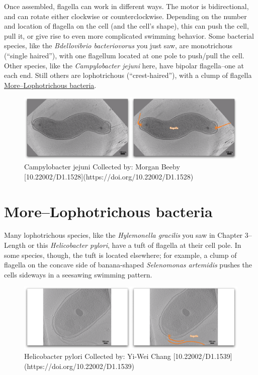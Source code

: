 \documentclass[]{tufte-book}
\begin{document}
Once assembled, flagella can work in different ways. The motor is
bidirectional, and can rotate either clockwise or counterclockwise.
Depending on the number and location of flagella on the cell (and the
cell's shape), this can push the cell, pull it, or give rise to even
more complicated swimming behavior. Some bacterial species, like the
\emph{Bdellovibrio bacteriovorus} you just saw, are monotrichous
(``single haired''), with one flagellum located at one pole to push/pull
the cell. Other species, like the \emph{Campylobacter jejuni} here, have
bipolar flagella--one at each end. Still others are lophotrichous
(``crest-haired''), with a clump of flagella
\protect\hyperlink{morelophotrichous-bacteria}{More--Lophotrichous
bacteria}.

\begin{figure}
\includegraphics{movie_stills/6_4} \caption[Campylobacter jejuni Collected by]{Campylobacter jejuni Collected by: Morgan Beeby [10.22002/D1.1528](https://doi.org/10.22002/D1.1528)}\label{fig:unnamed-chunk-106}
\end{figure}

\hypertarget{morelophotrichous-bacteria}{\section{More--Lophotrichous
bacteria}\label{morelophotrichous-bacteria}}

Many lophotrichous species, like the \emph{Hylemonella gracilis} you saw
in Chapter 3--Length or this \emph{Helicobacter pylori}, have a tuft of
flagella at their cell pole. In some species, though, the tuft is
located elsewhere; for example, a clump of flagella on the concave side
of banana-shaped \emph{Selenomonas artemidis} pushes the cells sideways
in a seesawing swimming pattern.

\begin{figure}
\includegraphics{movie_stills/6_4a} \caption[Helicobacter pylori Collected by]{Helicobacter pylori Collected by: Yi-Wei Chang [10.22002/D1.1539](https://doi.org/10.22002/D1.1539)}\label{fig:unnamed-chunk-107}
\end{figure}
\end{document}
